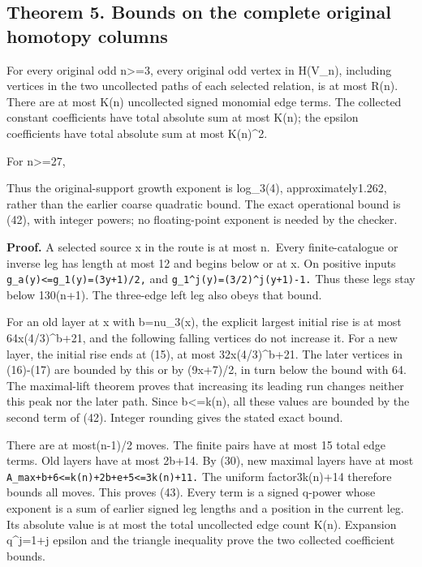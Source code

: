 \subsection{Theorem 5. Bounds on the complete original homotopy columns}

For every original odd n\textgreater=3, every original odd vertex in
H(V\_n), including vertices in the two uncollected paths of each
selected relation, is at most R(n). There are at most K(n) uncollected
signed monomial edge terms. The collected constant coefficients have
total absolute sum at most K(n); the epsilon coefficients have total
absolute sum at most K(n)\^{}2.

For n\textgreater=27,


Thus the original-support growth exponent is log\_3(4),
approximately1.262, rather than the earlier coarse quadratic bound. The
exact operational bound is (42), with integer powers; no floating-point
exponent is needed by the checker.

\textbf{Proof.} A selected source x in the route is at most n.~Every
finite-catalogue or inverse leg has length at most 12 and begins below
or at x. On positive inputs \nolinkurl{g_a(y)<=g_1(y)=(3y+1)/2,} and
\nolinkurl{g_1^j(y)=(3/2)^j(y+1)-1.} Thus these legs stay below
130(n+1). The three-edge left leg also obeys that bound.

For an old layer at x with b=nu\_3(x), the explicit largest initial rise
is at most 64x(4/3)\^{}b+21, and the following falling vertices do not
increase it. For a new layer, the initial rise ends at (15), at most
32x(4/3)\^{}b+21. The later vertices in (16)-(17) are bounded by this or
by (9x+7)/2, in turn below the bound with 64. The maximal-lift theorem
proves that increasing its leading run changes neither this peak nor the
later path. Since b\textless=k(n), all these values are bounded by the
second term of (42). Integer rounding gives the stated exact bound.

There are at most(n-1)/2 moves. The finite pairs have at most 15 total
edge terms. Old layers have at most 2b+14. By (30), new maximal layers
have at most \nolinkurl{A_max+b+6<=k(n)+2b+e+5<=3k(n)+11.} The uniform
factor3k(n)+14 therefore bounds all moves. This proves (43). Every term
is a signed q-power whose exponent is a sum of earlier signed leg
lengths and a position in the current leg. Its absolute value is at most
the total uncollected edge count K(n). Expansion q\^{}j=1+j epsilon and
the triangle inequality prove the two collected coefficient bounds.

